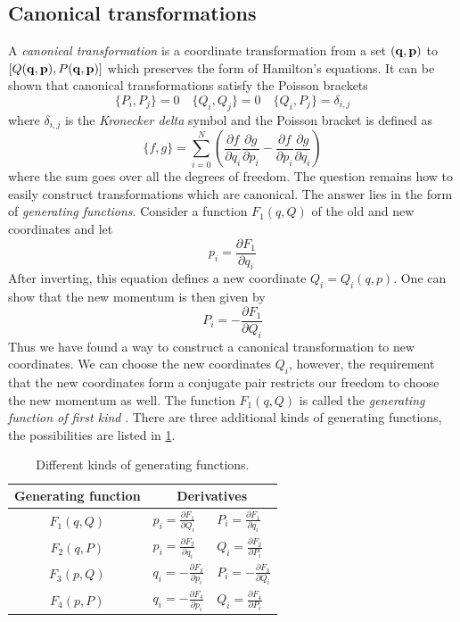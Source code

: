\documentclass[twoside,openright,titlepage,numbers=noenddot,headinclude,%
                footinclude=true,cleardoublepage=empty,abstractoff, 
                BCOR=5mm,paper=a4,fontsize=11pt,%
                american,%
                ]{scrreprt}%
\begin{document}
\subsection{Canonical transformations}
\label{sub:Canonical transformations}
A \emph{canonical transformation} is a coordinate transformation
from a set $(\boldsymbol{\mathbf{q}},\boldsymbol{\mathbf{p}})$ to $\left[Q(\boldsymbol{\mathbf{q}},\boldsymbol{\mathbf{p}}),
P(\boldsymbol{\mathbf{q}},\boldsymbol{\mathbf{p}})\right]$ which preserves the form of Hamilton's
equations. It can be shown that canonical transformations
satisfy the Poisson brackets
\begin{equation}
    \{P_i,P_j\}=0\quad\{Q_i,Q_j\}=0\quad\{Q_i,P_j\}=\delta_{i,j}
\end{equation}
where $\delta_{i,j}$ is the \emph{Kronecker delta} symbol and
the Poisson bracket is defined as
\begin{equation}
    \{f,g\}=\sum^N_{i=0}\left( \frac{\partial f}{\partial q_i} 
    \frac{\partial g}{\partial p_i} -\frac{\partial f}{\partial p_i} 
    \frac{\partial g}{\partial q_i} \right)
\end{equation}
where the sum goes over all the degrees of freedom. The question remains 
how to easily construct transformations which are canonical. The
answer lies in the form of \emph{generating functions}. Consider
a function $F_1(q,Q)$ of the old and new coordinates and let
\begin{equation}
    p_i= \frac{\partial F_1}{\partial q_i} 
\end{equation}
After inverting, this equation defines a new coordinate $Q_i=Q_i(q,p)$.
One can show that the new momentum is then given by
\begin{equation}
    P_i=- \frac{\partial F_1}{\partial Q_i} 
\end{equation}
Thus we have found a way to construct a canonical transformation to new
coordinates. We can choose the new coordinates $Q_i$, however, the requirement 
that the new coordinates form a conjugate pair restricts our freedom
to choose the new momentum as well. The function $F_1(q,Q)$ is called
the \emph{generating function of first kind} . There are three additional
kinds of generating functions, the possibilities are listed in 
\cref{tab:generating_functions}.
\begin{table}[h!]
\centering
\begin{tabular}{cll}
\toprule
    Generating function &\multicolumn{2}{c}{Derivatives}\\
\midrule
    $F_1(q,Q)$ & $p_i=\frac{\partial F_1}{\partial Q_i}$ & 
    $P_i=\frac{\partial F_1}{\partial q_i}$\\
    $F_2(q,P)$ & $p_i=\frac{\partial F_2}{\partial q_i}$ & 
    $Q_i=\frac{\partial F_2}{\partial P_i}$\\
    $F_3(p,Q)$ & $q_i=-\frac{\partial F_3}{\partial p_i}$ & 
    $P_i=-\frac{\partial F_3}{\partial Q_i}$\\
    $F_4(p,P)$ & $q_i=-\frac{\partial F_4}{\partial p_i}$ & 
    $Q_i=\frac{\partial F_4}{\partial P_i}$\\
\bottomrule
\end{tabular}
\caption{Different kinds of generating functions.}
\label{tab:generating_functions}
\end{table}
\end{document}
